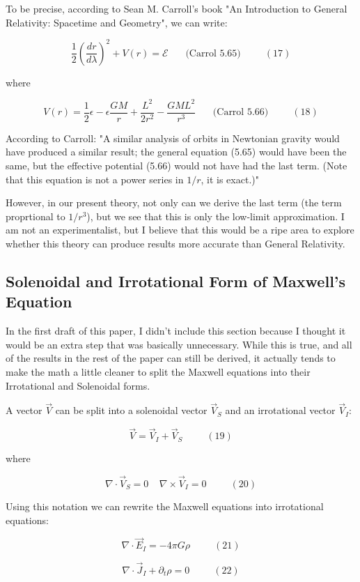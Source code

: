 \documentclass {article}
\begin{document}
To be precise, according to Sean M. Carroll's book "An Introduction to General Relativity: Spacetime and Geometry", we can write:

$$\frac 1 2 \left( \frac {dr}{d\lambda} \right)^2 + V(r) = \mathcal{E} ~~~~~~~~ \textrm{(Carrol 5.65)} ~~~~~~~~~~~ (17)$$

where

$$V(r) = \frac 1 2 \epsilon - \epsilon \frac {GM} r + \frac {L^2}{2r^2} - \frac {GML^2}{r^3} ~~~~~~~~ \textrm{(Carrol 5.66)} ~~~~~~~~~~~ (18)$$

According to Carroll: "A similar analysis of orbits in Newtonian gravity would have produced a similar result; the general equation (5.65) would have been the same, but the effective potential (5.66) would not have had the last term. (Note that this equation is not a power series in $1/r$, it is exact.)"

However, in our present theory, not only can we derive the last term (the term proprtional to $1/r^3$), but we see that this is only the low-limit approximation. I am not an experimentalist, but I believe that this would be a ripe area to explore whether this theory can produce results more accurate than General Relativity.


\subsection{Solenoidal and Irrotational Form of Maxwell's Equation}

In the first draft of this paper, I didn't include this section because I thought it would be an extra step that was basically unnecessary. While this is true, and all of the results in the rest of the paper can still be derived, it actually tends to make the math a little cleaner to split the Maxwell equations into their Irrotational and Solenoidal forms.

A vector $\vec V$ can be split into a solenoidal vector $\vec V_S$ and an irrotational vector $\vec V_I$:

$$\vec V = \vec V_I + \vec V_S ~~~~~~~~~~~ (19)$$

where

$$\nabla \cdot \vec V_S = 0 ~~~~~ \nabla \times \vec V_I = 0 ~~~~~~~~~~~ (20)$$

Using this notation we can rewrite the Maxwell equations into irrotational equations:

$$\nabla \cdot \vec E_I = -4 \pi G  \rho ~~~~~~~~~~~ (21)$$

$$\nabla \cdot \vec J_I + \partial_t \rho = 0 ~~~~~~~~~~~ (22)$$
\end{document}

